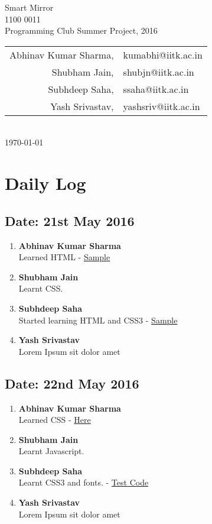 \documentclass[11pt,a4paper]{article}
\begin{document}
  \centering
  \thispagestyle{plain}
  Smart Mirror\\
  1100 0011\\
  Programming Club Summer Project, 2016 \vspace{2mm}\\ 
  \begin{tabular}{r l}
    Abhinav Kumar Sharma,&kumabhi@iitk.ac.in\\
    Shubham Jain,&shubjn@iitk.ac.in\\
    Subhdeep Saha,&ssaha@iitk.ac.in\\
    Yash Srivastav,&yashsriv@iitk.ac.in
  \end{tabular}\\
  \today
  \newpage

  \raggedright

  \section{Daily Log}
    \subsection{Date: 21st May 2016}
      \begin{enumerate}
        \item
          \textbf{Abhinav Kumar Sharma\\ }
          Learned HTML - \href{https://gist.github.com/jmoriarty221B/3055cc363fe67bdd0ad2238cb4257781}{Sample}
        \item
          \textbf{Shubham Jain}\\ 
           Learnt CSS.
        \item
          \textbf{Subhdeep Saha}\\ 
          Started learning HTML and CSS3 - \href{https://gist.github.com/yashsriv/fceca800cbd89e67dab8becbe3c785f8}{Sample}
        \item
          \textbf{Yash Srivastav}\\ 
           Lorem Ipsum sit dolor amet
      \end{enumerate}
    \subsection{Date: 22nd May 2016}
      \begin{enumerate}
        \item
          \textbf{Abhinav Kumar Sharma\\ }
          Learned CSS - \href{https://gist.github.com/jmoriarty221B/936e81e66e494c73a38f44b213d7995d}{Here}
        \item
          \textbf{Shubham Jain}\\ 
           Learnt Javascript.
        \item
          \textbf{Subhdeep Saha}\\ 
          Learnt CSS3 and fonts. - \href{https://gist.github.com/yashsriv/c37265c4bafe3a21123cbd9dfaa7f6b3}{Test Code}
        \item
          \textbf{Yash Srivastav}\\ 
           Lorem Ipsum sit dolor amet
      \end{enumerate}
\end{document}
